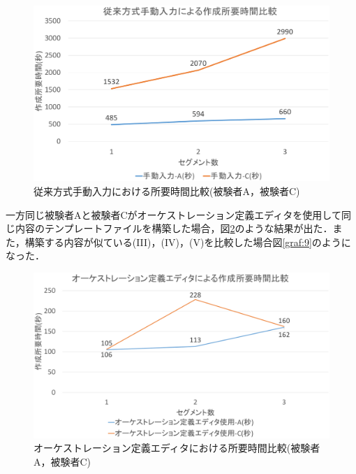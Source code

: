 \documentclass[mingoth]{kut-paper}		%
\begin{document}
\begin{description}
		\begin{figure}[H]
			\begin{center}
				\includegraphics[scale=0.45]{Document/ManualComparisonAC.eps}
				\caption{従来方式手動入力における所要時間比較(被験者A，被験者C)}
				\label{graf:4}
			\end{center}
		\end{figure}
		\newpage
		一方同じ被験者Aと被験者Cがオーケストレーション定義エディタを使用して同じ内容のテンプレートファイルを構築した場合，図\ref{graf:5}のような結果が出た．また，構築する内容が似ている(I\hspace{-1pt}I\hspace{-1pt}I)，(I\hspace{-1pt}V)，(V)を比較した場合図\ref{graf:9}のようになった．
			
		\begin{figure}[H]
			\begin{center}
				\includegraphics[scale=0.45]{Document/EditorComparisonAC.eps}
				\caption{オーケストレーション定義エディタにおける所要時間比較(被験者A，被験者C)}
				\label{graf:5}
			\end{center}
		\end{figure}
		

\end{description}
\end{document}
